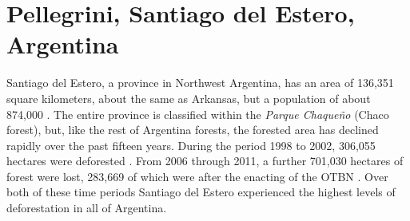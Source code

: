 \section{Pellegrini, Santiago del Estero, Argentina}

Santiago del Estero, a province in Northwest Argentina, has an area of 136,351 square kilometers, about the same as Arkansas, but a population of about 874,000 \autocite{estadistica-y-c2010a}. The entire province is classified within the \textit{Parque Chaqueño} (Chaco forest), but, like the rest of Argentina forests, the forested area has declined rapidly over the past fifteen years. During the period 1998 to 2002, 306,055 hectares were deforested \autocite{secretaria-de-a2007informe}. From 2006 through 2011, a further 701,030 hectares of forest were lost, 283,669 of which were after the enacting of the OTBN \autocite{secreteria-de-a2012monitoreo}. Over both of these time periods Santiago del Estero experienced the highest levels of deforestation in all of Argentina.

